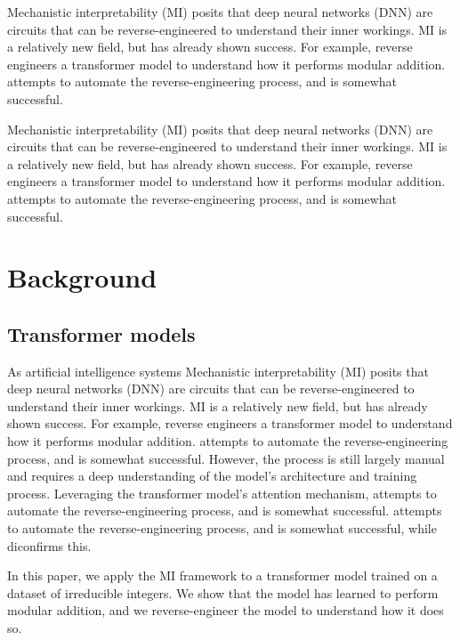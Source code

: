 \documentclass[11pt]{article} %
\begin{document}
\begin{multicols}{2}
  Mechanistic interpretability (MI) posits that deep neural networks
  (DNN) are circuits that can be reverse-engineered to understand their
  inner workings. MI is a relatively new field, but has already shown
  success. For example, reverse engineers a transformer model to
  understand how it performs modular addition. attempts to automate the
  reverse-engineering process, and is somewhat successful.

  Mechanistic interpretability (MI) posits that deep neural networks
  (DNN) are circuits that can be reverse-engineered to understand their
  inner workings. MI is a relatively new field, but has already shown
  success. For example, reverse engineers a transformer model to
  understand how it performs modular addition. attempts to automate the
  reverse-engineering process, and is somewhat successful.

  \section{Background}\label{background}

  \subsection{Transformer models}\label{transformer-models}

  As artificial intelligence systems Mechanistic interpretability (MI)
  posits that deep neural networks (DNN) are circuits that can be
  reverse-engineered to understand their inner workings. MI is a
  relatively new field, but has already shown success. For example,
  \textcite{nanda2023} reverse engineers a transformer model
  \autocite{vaswani2017} to understand how it performs modular addition.
  \textcite{cover2006} attempts to automate the reverse-engineering
  process, and is somewhat successful. However, the process is still
  largely manual and requires a deep understanding of the model's
  architecture and training process. Leveraging the transformer model's
  attention mechanism, \textcite{conmy2023} attempts to automate the
  reverse-engineering process, and is somewhat successful.
  \textcite{conmy2023} attempts to automate the reverse-engineering
  process, and is somewhat successful, while \textcite{belcak2022}
  diconfirms this.

  In this paper, we apply the MI framework to a transformer model
  trained on a dataset of irreducible integers. We show that the model
  has learned to perform modular addition, and we reverse-engineer the
  model to understand how it does so.


\end{multicols}
\end{document}
